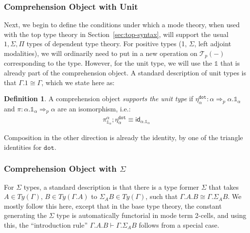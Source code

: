 \documentclass[10pt]{article}
\theoremstyle{definition}
\newtheorem{definition}{Definition}
\newcommand{\tcell}{\Rightarrow}
\newcommand{\id}{\mathsf{id}}
\newcommand\El[2]{\mathcal{T}_{#1}(#2)}
\newcommand{\tdot}{\ensuremath{\mathtt{dot}}}
\newcommand\One{\ensuremath{\mathds{1}}}
\begin{document}
\subsubsection{Comprehension Object with Unit}

Next, we begin to define the conditions under which a mode theory, when
used with the top type theory in Section~\ref{sec:top-syntax}, will
support the usual $1, \Sigma, \Pi$ types of dependent type theory.  For
positive types (1, $\Sigma$, left adjoint modalities), we will
ordinarily need to put in a new operation on $\El{p}{-}$ corresponding
to the type.  However, for the unit type, we will use the $\One$ that is
already part of the comprehension object.  A standard description of
unit types is that $\Gamma.1 \cong \Gamma$, which we state here as:
\begin{definition}\label{def:supports-unit}
A comprehension object \emph{supports the unit type} if
$\eta^\tdot_\alpha : \alpha \tcell_p \alpha.\One_\alpha$ and $\pi :
\alpha.\One_\alpha \tcell_p \alpha$ are an isomorphism, i.e.:
\begin{align}
\pi^\alpha_{\One_\alpha} ; \eta^\tdot_\alpha \equiv \id_{\alpha.\One_\alpha}
\end{align}
\end{definition}
Composition in the other direction is already the identity, by one of the triangle identities for $\tdot$.

\subsubsection{Comprehension Object with $\Sigma$}
\label{sec:compobj-sigma}

For $\Sigma$ types, a standard description is that there is a type
former $\Sigma$ that takes $A \in Ty(\Gamma)$, $B \in Ty(\Gamma.A)$ to
$\Sigma_A B \in Ty(\Gamma)$, such that $\Gamma.A.B \cong \Gamma.\Sigma_A
B$.  We mostly follow this here, except that in the base type theory,
the constant generating the $\Sigma$ type is automatically functorial in
mode term 2-cells, and using this, the ``introduction rule''
$\Gamma.A.B \vdash \Gamma.\Sigma_A B$ follows from a special case.
\end{document}
